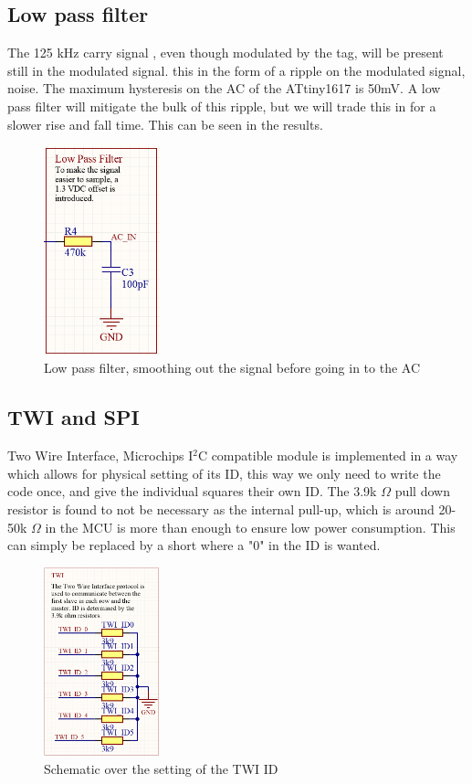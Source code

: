 \subsection{Low pass filter}
The 125 kHz carry signal , even though modulated by the tag, will be present still in the modulated signal. this in the form of a ripple on the modulated signal, noise. The maximum hysteresis on the AC of the ATtiny1617 is 50mV. A low pass filter will mitigate the bulk of this ripple, but we will trade this in for a slower rise and fall time. This can be seen in the results. 
\begin{figure}[H]
    \centering
    \includegraphics[width=0.3\textwidth]{05_My_Implementation/figures/LPF.png}
    \caption{Low pass filter, smoothing out the signal before going in to the AC}
    \label{fig:my_label}
\end{figure}

\subsection{TWI and SPI}
Two Wire Interface, Microchips I$^2$C compatible module is implemented in a way which allows for physical setting of its ID, this way we only need to write the code once, and give the individual squares their own ID. The 3.9k  $\Omega$ pull down resistor is found to not be necessary as the internal pull-up, which is around 20-50k $\Omega$ in the MCU is more than enough to ensure low power consumption. This can simply be replaced by a short where a "0" in the ID is wanted.

\begin{figure}[H]
    \centering
    \includegraphics[width=0.3\textwidth]{05_My_Implementation/figures/TWI.png}
    \caption{Schematic over the setting of the TWI ID}
    \label{fig:my_label}
\end{figure}

